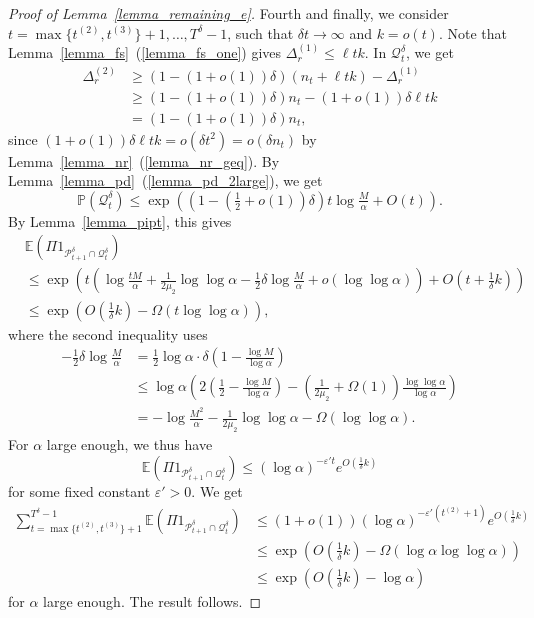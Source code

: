 \documentclass{article}
\theoremstyle{plain}
\theoremstyle{remark}
\theoremstyle{plain}
\numberwithin{equation}{section}
\begin{document}
\begin{proof}[Proof of Lemma~\ref{lemma_remaining_e}]
		Fourth and finally, we consider $t=\max\{t^{(2)},t^{(3)}\}+1,\ldots,T^{\delta}-1$, such that $\delta t\to\infty$ and $k=o(t)$. Note that Lemma~\ref{lemma_fs}~(\ref{lemma_fs_one}) gives $\Delta_r^{(1)}\leq\ell tk$. In $\mathcal{Q}_t^{\delta}$, we get
		\begin{align}
			\Delta_r^{(2)}
			&\geq(1-(1+o(1))\delta)(n_t+\ell tk)-\Delta_r^{(1)}
			\\&\geq(1-(1+o(1))\delta)n_t-(1+o(1))\delta\ell tk
			\\&=(1-(1+o(1))\delta)n_t,
		\end{align}
		since $(1+o(1))\delta\ell tk=o(\delta t^2)=o(\delta n_t)$ by Lemma~\ref{lemma_nr}~(\ref{lemma_nr_geq}). By Lemma~\ref{lemma_pd}~(\ref{lemma_pd_2large}), we get $$\mathbb{P}(\mathcal{Q}_t^{\delta})\leq\exp\left((1-(\tfrac12+o(1))\delta)t\log\tfrac{M}{\alpha}+O(t)\right).$$ By Lemma~\ref{lemma_pipt}, this gives
		\begin{align}
			&\mathbb{E}(\Pi1_{\mathcal{P}_{t+1}^{\delta}\cap\mathcal{Q}_t^{\delta}})
			\\&\leq\exp\left(t\left(\log\tfrac{tM}{\alpha}+\tfrac1{2\mu_2}\log\log\alpha-\tfrac12\delta\log\tfrac{M}{\alpha}+o(\log\log\alpha)\right)+O(t+\tfrac1{\delta}k)\right)
			\\&\leq\exp\left(O(\tfrac1{\delta}k)-\Omega(t\log\log\alpha)\right),
		\end{align}
		where the second inequality uses
		\begin{align}
			-\tfrac12\delta\log\tfrac{M}{\alpha}
			&=\tfrac12\log\alpha\cdot\delta\left(1-\tfrac{\log M}{\log\alpha}\right)
			\\&\leq\log\alpha\left(2\left(\tfrac12-\tfrac{\log M}{\log\alpha}\right)-(\tfrac1{2\mu_2}+\Omega(1))\tfrac{\log\log\alpha}{\log\alpha}\right)
			\\&=-\log\tfrac{M^2}{\alpha}-\tfrac1{2\mu_2}\log\log\alpha-\Omega(\log\log\alpha).
		\end{align}
		For $\alpha$ large enough, we thus have $$\mathbb{E}(\Pi1_{\mathcal{P}_{t+1}^{\delta}\cap\mathcal{Q}_t^{\delta}})\leq(\log\alpha)^{-\varepsilon't}e^{O(\frac1{\delta}k)}$$ for some fixed constant $\varepsilon'>0$. We get
		\begin{align}
			\sum_{t=\max\{t^{(2)},t^{(3)}\}+1}^{T^{\delta}-1}\mathbb{E}(\Pi1_{\mathcal{P}_{t+1}^{\delta}\cap\mathcal{Q}_t^{\delta}})
			&\leq(1+o(1))(\log\alpha)^{-\varepsilon'(t^{(2)}+1)}e^{O(\frac1{\delta}k)}
			\\&\leq\exp\left(O(\tfrac1{\delta}k)-\Omega(\log\alpha\log\log\alpha)\right)
			\\&\leq\exp\left(O(\tfrac1{\delta}k)-\log\alpha\right)
		\end{align}
		for $\alpha$ large enough. The result follows.
	\end{proof}
	
\end{document}
